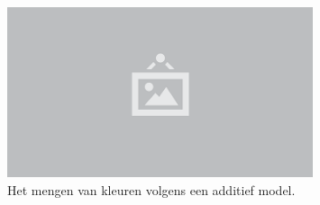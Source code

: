 \begin{figure}
  \centering
  \includegraphics[width=0.8\textwidth]{./img/raw/placeholder.png}
  \caption{Het mengen van kleuren volgens een additief model.}
  \label{fig:fw-kleur}
\end{figure}
